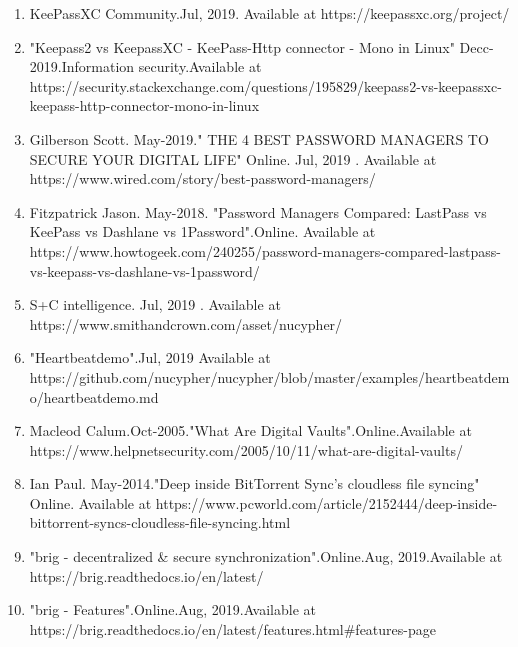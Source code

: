 \documentclass[12pt]{article}
\begin{document}
\begin{enumerate}
\item KeePassXC Community.Jul, 2019. Available at https://keepassxc.org/project/
 
\item "Keepass2 vs KeepassXC - KeePass-Http connector - Mono in Linux" Decc-2019.Information security.Available at https://security.stackexchange.com/questions/195829/keepass2-vs-keepassxc-keepass-http-connector-mono-in-linux

\item Gilberson Scott. May-2019." THE 4 BEST PASSWORD MANAGERS TO SECURE YOUR DIGITAL LIFE" Online. Jul, 2019 . Available at https://www.wired.com/story/best-password-managers/

\item Fitzpatrick Jason. May-2018. "Password Managers Compared: LastPass vs KeePass vs Dashlane vs 1Password".Online. Available at https://www.howtogeek.com/240255/password-managers-compared-lastpass-vs-keepass-vs-dashlane-vs-1password/
 
\item S+C intelligence. Jul, 2019 . Available at https://www.smithandcrown.com/asset/nucypher/

\item "Heartbeatdemo".Jul, 2019 Available at https://github.com/nucypher/nucypher/blob/master/examples/heartbeatdemo/heartbeatdemo.md

\item Macleod Calum.Oct-2005."What Are Digital Vaults".Online.Available at https://www.helpnetsecurity.com/2005/10/11/what-are-digital-vaults/

\item Ian Paul. May-2014."Deep inside BitTorrent Sync's cloudless file syncing" Online. Available at https://www.pcworld.com/article/2152444/deep-inside-bittorrent-syncs-cloudless-file-syncing.html

\item "brig - decentralized & secure synchronization".Online.Aug, 2019.Available at https://brig.readthedocs.io/en/latest/

\item "brig - Features".Online.Aug, 2019.Available at https://brig.readthedocs.io/en/latest/features.html#features-page






   
\end{enumerate}
\end{document}

